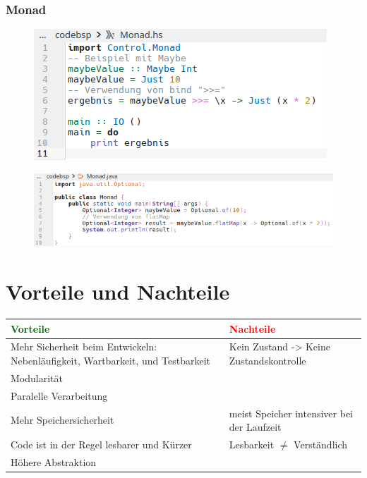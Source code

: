 \documentclass{beamer}
\begin{document}
\begin{frame}
\frametitle{Monad}

  \begin{figure}
     \centering
     \includegraphics[scale=0.5]{bilder/FP-Monad-hs.png}
 \end{figure}
 \begin{figure}
     \centering
     \includegraphics[scale=0.5]{bilder/FP-Monad-java.png}
 \end{figure}

\end{frame}


\section{Vorteile und Nachteile}
\begin{frame}
\centering
	\begin{tabular}{ |p{5cm}|p{5cm}|  }
		\hline
             \textcolor{darkgreen}{Vorteile} & \textcolor{red}{Nachteile} \\
		\hline
		Mehr Sicherheit beim Entwickeln: Nebenläufigkeit, Wartbarkeit, und Testbarkeit & Kein Zustand -> Keine Zustandskontrolle \\
            \hline
            Modularität & \\
            Paralelle Verarbeitung& \\
		\hline
            Mehr Speichersicherheit  & meist Speicher intensiver bei der Laufzeit  \\
		\hline
    Code ist in der Regel lesbarer und Kürzer & Lesbarkeit $\neq$ Verständlich \\
            Höhere Abstraktion & \\
		\hline

 \end{tabular}
\end{frame}
\end{document}
